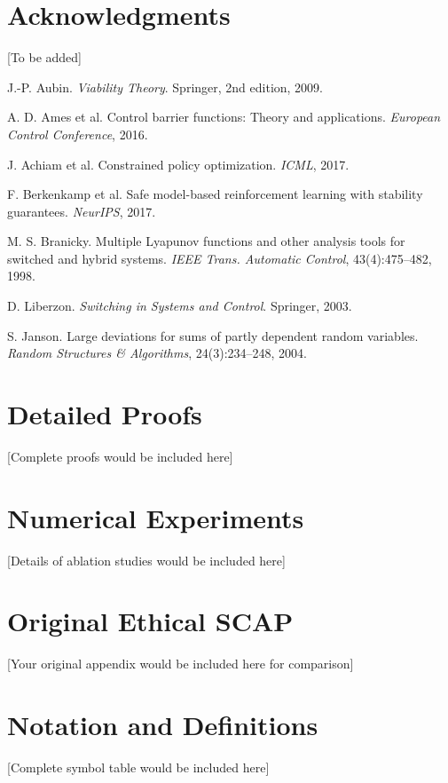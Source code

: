 \documentclass[11pt,a4paper]{article}
\theoremstyle{definition}
\begin{document}
\section*{Acknowledgments}
[To be added]

\begin{thebibliography}{99}

J.-P. Aubin. \emph{Viability Theory}. Springer, 2nd edition, 2009.

A. D. Ames et al. Control barrier functions: Theory and applications. \emph{European Control Conference}, 2016.

J. Achiam et al. Constrained policy optimization. \emph{ICML}, 2017.

F. Berkenkamp et al. Safe model-based reinforcement learning with stability guarantees. \emph{NeurIPS}, 2017.

M. S. Branicky. Multiple Lyapunov functions and other analysis tools for switched and hybrid systems. \emph{IEEE Trans. Automatic Control}, 43(4):475--482, 1998.

D. Liberzon. \emph{Switching in Systems and Control}. Springer, 2003.

S. Janson. Large deviations for sums of partly dependent random variables. \emph{Random Structures \& Algorithms}, 24(3):234--248, 2004.

\end{thebibliography}

\appendix

\section{Detailed Proofs}
[Complete proofs would be included here]

\section{Numerical Experiments}
[Details of ablation studies would be included here]

\section{Original Ethical SCAP}
[Your original appendix would be included here for comparison]

\section{Notation and Definitions}
[Complete symbol table would be included here]
\end{document}
